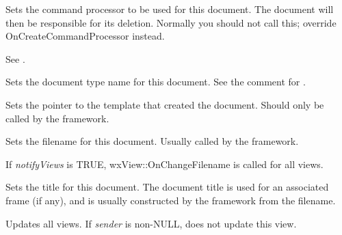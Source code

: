 Sets the command processor to be used for this document. The document will then be responsible
for its deletion. Normally you should not call this; override OnCreateCommandProcessor
instead.

See .



Sets the document type name for this document. See the comment for .



Sets the pointer to the template that created the document. Should only be called by the
framework.



Sets the filename for this document. Usually called by the framework.

If {\it notifyViews} is TRUE, wxView::OnChangeFilename is called for all views.



Sets the title for this document. The document title is used for an associated
frame (if any), and is usually constructed by the framework from
the filename.

\label{wxdocumentupdateallviews}


Updates all views. If {\it sender} is non-NULL, does not update this view.

